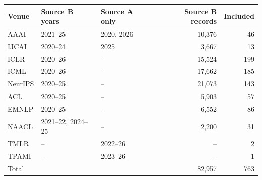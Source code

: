 \begin{tabular}{@{}lllrr@{}}
\toprule
Venue & Source B years & Source A only & Source B records & Included \\
\midrule
AAAI & 2021--25 & 2020, 2026 & 10,376 & 46 \\
IJCAI & 2020--24 & 2025 & 3,667 & 13 \\
ICLR & 2020--26 & -- & 15,524 & 199 \\
ICML & 2020--26 & -- & 17,662 & 185 \\
NeurIPS & 2020--25 & -- & 21,073 & 143 \\
ACL & 2020--25 & -- & 5,903 & 57 \\
EMNLP & 2020--25 & -- & 6,552 & 86 \\
NAACL & 2021--22, 2024--25 & -- & 2,200 & 31 \\
TMLR & -- & 2022--26 & -- & 2 \\
TPAMI & -- & 2023--26 & -- & 1 \\
\midrule
Total & & & 82,957 & 763 \\
\bottomrule
\end{tabular}
